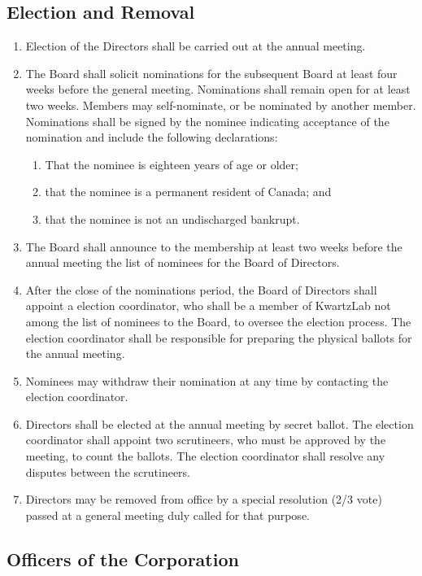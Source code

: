 \documentclass{article}
\begin{document}
\subsection{Election and Removal}

\begin{enumerate}
\item Election of the Directors shall be carried out at the annual meeting.
\item The Board shall solicit nominations for the subsequent Board at least four weeks before the general meeting. Nominations shall remain open for at least two weeks. Members may self-nominate, or be nominated by another member. Nominations shall be signed by the nominee indicating acceptance of the nomination and include the following declarations:
	\begin{enumerate}
	\item That the nominee is eighteen years of age or older;
	\item that the nominee is a permanent resident of Canada; and
	\item that the nominee is not an undischarged bankrupt.
	\end{enumerate}
\item The Board shall announce to the membership at least two weeks before the annual meeting the list of nominees for the Board of Directors.
\item After the close of the nominations period, the Board of Directors shall appoint a election coordinator, who shall be a member of KwartzLab not among the list of nominees to the Board, to oversee the election process. The election coordinator shall be responsible for preparing the physical ballots for the annual meeting.
\item Nominees may withdraw their nomination at any time by contacting the election coordinator.
\item Directors shall be elected at the annual meeting by secret ballot. The election coordinator shall appoint two scrutineers, who must be approved by the meeting, to count the ballots. The election coordinator shall resolve any disputes between the scrutineers.
\item Directors may be removed from office by a special resolution (2/3 vote) passed at a general meeting duly called for that purpose.
\end{enumerate}

\subsection{Officers of the Corporation}
\end{document}
